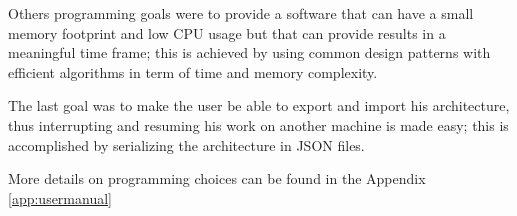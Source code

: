 Others programming goals were to provide a software that can have a small memory footprint and low CPU usage but that can provide results in a meaningful time frame; this is achieved by using common design patterns with efficient algorithms in term of time and memory complexity.

The last goal was to make the user be able to export and import his architecture, thus interrupting and resuming his work on another machine is made easy; this is accomplished by serializing the architecture in JSON files.

More details on programming choices can be found in the Appendix \ref{app:usermanual}


